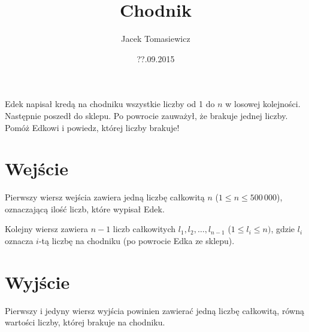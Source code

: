 \documentclass[zad,zawodnik,utf8]{sinol}
\title{Chodnik}
\author{Jacek Tomasiewicz}
\date{??.09.2015}
\begin{document}
  \begin{tasktext}%
Edek napisał kredą na chodniku wszystkie liczby od 1 do $n$ w losowej kolejności. Następnie poszedł do sklepu. Po powrocie zauważył, że brakuje jednej liczby. Pomóż Edkowi i powiedz, której liczby brakuje!

  \section{Wejście}
Pierwszy wiersz wejścia zawiera jedną liczbę całkowitą $n$ ($1 \leq n \leq 500\,000$), oznaczającą ilość liczb, które wypisał Edek.

Kolejny wiersz zawiera $n-1$ liczb całkowitych $l_1, l_2, \ldots, l_{n-1}$ ($1 \leq l_i \leq n)$, gdzie $l_i$ oznacza $i$-tą liczbę na chodniku (po powrocie Edka ze sklepu).

  \section{Wyjście}
Pierwszy i jedyny wiersz wyjścia powinien zawierać jedną liczbę całkowitą, równą wartości liczby, której brakuje na chodniku.

     \makecompactexample


  \end{tasktext}
\end{document}

